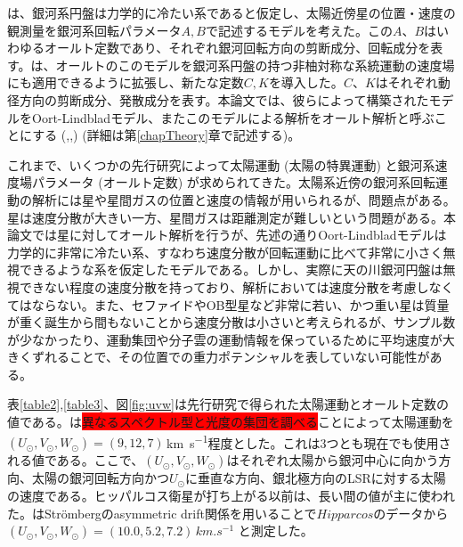 \cite{Oort1927a}は、銀河系円盤は力学的に冷たい系であると仮定し、太陽近傍星の位置・速度の観測量を銀河系回転パラメータ$A,B$で記述するモデルを考えた。この$A、B$はいわゆるオールト定数であり、それぞれ銀河回転方向の剪断成分、回転成分を表す。\cite{Chandra42}は、オールトのこのモデルを銀河系円盤の持つ非柚対称な系統運動の速度場にも適用できるように拡張し、新たな定数$C,K$を導入した。$C、K$はそれぞれ動径方向の剪断成分、発散成分を表す。本論文では、彼らによって構築されたモデルをOort-Lindbladモデル、またこのモデルによる解析をオールト解析と呼ぶことにする (\cite{Oort1927a},\cite{Lindblad1927},\cite{Chandra42}) (詳細は第\ref{chapTheory}章で記述する)。



これまで、いくつかの先行研究によって太陽運動 (太陽の特異運動) と銀河系速度場パラメータ (オールト定数) が求められてきた。太陽系近傍の銀河系回転運動の解析には星や星間ガスの位置と速度の情報が用いられるが、問題点がある。星は速度分散が大きい一方、星間ガスは距離測定が難しいという問題がある。本論文では星に対してオールト解析を行うが、先述の通りOort-Lindbladモデルは力学的に非常に冷たい系、すなわち速度分散が回転運動に比べて非常に小さく無視できるような系を仮定したモデルである。しかし、実際に天の川銀河円盤は無視できない程度の速度分散を持っており、解析においては速度分散を考慮しなくてはならない。また、セファイドやOB型星など非常に若い、かつ重い星は質量が重く誕生から間もないことから速度分散は小さいと考えられるが、サンプル数が少なかったり、運動集団や分子雲の運動情報を保っているために平均速度が大きくずれることで、その位置での重力ポテンシャルを表していない可能性がある。

表\ref{table2},\ref{table3}、図\ref{fig:uvw}は先行研究で得られた太陽運動とオールト定数の値である。\cite{Delhaye1965}は\colorbox{red}{異なるスペクトル型と光度の集団を調べる}ことによって太陽運動を$(U_{\odot},V_{\odot},W_{\odot})=(9,12,7)$\,\si{km.s^{-1}}程度とした。これは3つとも現在でも使用される値である。ここで、$(U_{\odot},V_{\odot},W_{\odot})$はそれぞれ太陽から銀河中心に向かう方向、太陽の銀河回転方向かつ$U_{\odot}$に垂直な方向、銀北極方向のLSRに対する太陽の速度である。ヒッパルコス衛星が打ち上がる以前は、長い間\cite{Delhaye1965}の値が主に使われた。\cite{DB1998}はStr\"{o}mbergのasymmetric drift関係を用いることで$Hipparcos$のデータから$(U_{\odot},V_{\odot},W_{\odot}) = (10.0, 5.2, 7.2)\,\si{km.s^{-1}}$ と測定した。

